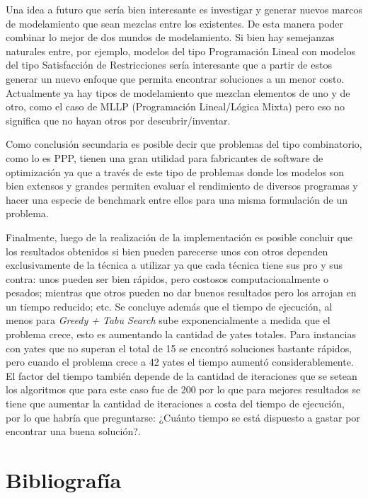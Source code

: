 \documentclass[letter, 10pt]{article}
\begin{document}
Una idea a futuro que sería bien interesante es investigar y generar nuevos marcos de modelamiento que sean mezclas entre los existentes. De esta manera poder combinar lo mejor de dos mundos de modelamiento. Si bien hay semejanzas naturales entre, por ejemplo, modelos del tipo Programación Lineal con modelos del tipo Satisfacción de Restricciones sería interesante que a partir de estos generar un nuevo enfoque que permita encontrar soluciones a un menor costo. Actualmente ya hay tipos de modelamiento que mezclan elementos de uno y de otro, como el caso de MLLP (Programación Lineal/Lógica Mixta) pero eso no significa que no hayan otros por descubrir/inventar.

Como conclusión secundaria es posible decir que problemas del tipo combinatorio, como lo es PPP, tienen una gran utilidad para fabricantes de software de optimización ya que a través de este tipo de problemas donde los modelos son bien extensos y grandes permiten evaluar el rendimiento de diversos programas y hacer una especie de benchmark entre ellos para una misma formulación de un problema.

Finalmente, luego de la realización de la implementación es posible concluir que los resultados obtenidos si bien pueden parecerse unos con otros dependen exclusivamente de la técnica a utilizar ya que cada técnica tiene sus pro y sus contra: unos pueden ser bien rápidos, pero costosos computacionalmente o pesados; mientras que otros pueden no dar buenos resultados pero los arrojan en un tiempo reducido; etc. Se concluye además que el tiempo de ejecución, al menos para \textit{Greedy + Tabu Search} sube exponencialmente a medida que el problema crece, esto es aumentando la cantidad de yates totales. Para instancias con yates que no superan el total de 15 se encontró soluciones bastante rápidos, pero cuando el problema crece a 42 yates el tiempo aumentó considerablemente. El factor del tiempo también depende de la cantidad de iteraciones que se setean los algoritmos que para este caso fue de 200 por lo que para mejores resultados se tiene que aumentar la cantidad de iteraciones a costa del tiempo de ejecución, por lo que habría que preguntarse: ¿Cuánto tiempo se está dispuesto a gastar por encontrar una buena solución?.



\section{Bibliografía}


\end{document}
